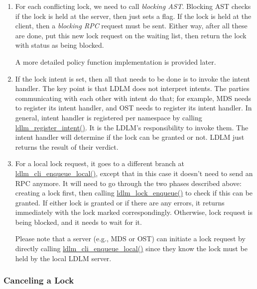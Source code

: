 \begin{enumerate}
If the answer to both questions is no, then no conflict is found, and the lock can be granted.
Call \textit{completion AST}\footnote{AST is the acronym for Asynchronous System
Trap from VMS lock design. Here, we consider it to be synonymous with a
callback.}, return the granted lock, and we are done.  Otherwise, continue.

\item For each conflicting lock, we need to call \textit{blocking AST}.
Blocking AST checks if the lock is held at the server, then just sets a flag. If
the lock is held at the client, then a \textit{blocking RPC} request must be
sent. Either way, after all these are done, put this new lock request on the
waiting list, then return the lock with status as being blocked.

A more detailed policy function implementation is provided later.

\item \label{lm:intent} If the lock intent is set, then all that needs to be done is to
invoke the intent handler. The key point is that LDLM does not interpret intents. The
parties communicating with each other with intent do that; for example, MDS needs to
register its intent handler, and OST needs to register its intent handler. In general,
intent handler is registered per namespace by calling
\url{ldlm_register_intent()}. It is the LDLM's responsibility to invoke them.
The intent handler will determine if the lock can be granted or not. LDLM just
returns the result of their verdict.

\item \label{lm:local} For a local lock request, it goes to a different branch
at \url{ldlm_cli_enqueue_local()}, except that in this case it doesn't need to
send an RPC anymore. It will need to go through the two phases described above:
creating a lock first, then calling \url{ldlm_lock_enqueue()} to check if this
can be granted. If either lock is granted or if there are any errors, it
returns immediately with the lock marked correspondingly. Otherwise, lock request
is being blocked, and it needs to wait for it.

Please note that a server (e.g., MDS or OST) can initiate a lock request by
directly calling \url{ldlm_cli_enqueue_local()} since they know the lock must
be held by the local LDLM server. 

\end{enumerate}

\subsubsection{Canceling a Lock}

